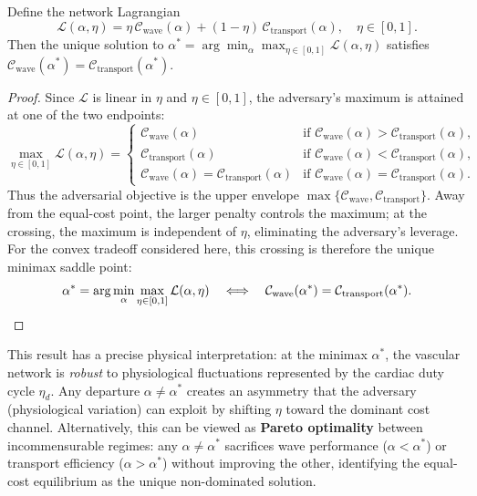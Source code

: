\begin{proposition}
\label{prop:minimax_saddle}
Define the network Lagrangian
\begin{equation}
\mathcal{L}(\alpha, \eta) = \eta\,
\mathcal{C}_{\mathrm{wave}}(\alpha) + (1 - \eta)\,
\mathcal{C}_{\mathrm{transport}}(\alpha),
\quad \eta \in [0,1].
\label{eq:minimax_lagrangian}
\end{equation}
Then the unique solution to $\alpha^* = \arg\min_\alpha \max_{\eta \in
[0,1]} \mathcal{L}(\alpha, \eta)$ satisfies
$\mathcal{C}_{\mathrm{wave}}(\alpha^*) =
\mathcal{C}_{\mathrm{transport}}(\alpha^*)$.
\end{proposition}
\begin{proof}
Since $\mathcal{L}$ is linear in $\eta$ and $\eta \in [0,1]$, the
adversary's maximum is attained at one of the two endpoints:
\begin{equation}
\max_{\eta \in [0,1]} \mathcal{L}(\alpha, \eta) =
\begin{cases}
\mathcal{C}_{\mathrm{wave}}(\alpha)
& \text{if } \mathcal{C}_{\mathrm{wave}}(\alpha) >
\mathcal{C}_{\mathrm{transport}}(\alpha), \\[4pt]
\mathcal{C}_{\mathrm{transport}}(\alpha)
& \text{if } \mathcal{C}_{\mathrm{wave}}(\alpha) <
\mathcal{C}_{\mathrm{transport}}(\alpha), \\[4pt]
\mathcal{C}_{\mathrm{wave}}(\alpha)=\mathcal{C}_{\mathrm{transport}}(\alpha)
& \text{if } \mathcal{C}_{\mathrm{wave}}(\alpha) =
\mathcal{C}_{\mathrm{transport}}(\alpha).
\end{cases}
\end{equation}
Thus the adversarial objective is the upper envelope
$\max\{\mathcal{C}_{\mathrm{wave}},\mathcal{C}_{\mathrm{transport}}\}$. Away
from the equal-cost point, the larger penalty controls the maximum; at the
crossing, the maximum is independent of $\eta$, eliminating the adversary's
leverage. For the convex tradeoff considered here, this crossing is therefore
the unique minimax saddle point:
\begin{equation}
\alpha^* = \arg\min_\alpha \max_{\eta \in [0,1]} \mathcal{L}(\alpha, \eta)
\quad \Longleftrightarrow \quad
\mathcal{C}_{\mathrm{wave}}(\alpha^*) =
\mathcal{C}_{\mathrm{transport}}(\alpha^*). \qedhere
\end{equation}
\end{proof}

This result has a precise physical interpretation: at the minimax $\alpha^*$,
the vascular network is \emph{robust} to physiological fluctuations
represented by the cardiac duty cycle $\eta_d$. Any departure $\alpha
\neq \alpha^*$ creates an asymmetry that the adversary (physiological variation)
can exploit by shifting $\eta$ toward the dominant cost channel. Alternatively,
this can be viewed as \textbf{Pareto optimality} between incommensurable
regimes: any $\alpha \neq \alpha^*$ sacrifices wave performance ($\alpha <
\alpha^*$) or transport efficiency ($\alpha > \alpha^*$) without improving the
other, identifying the equal-cost equilibrium as the unique non-dominated
solution.

